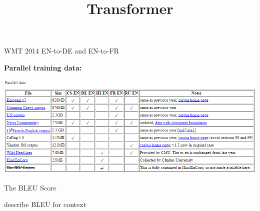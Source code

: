 



\newcommand{\titlefigure}{figure/transformer_sq.png}
\newcommand{\learninggoals}{
\item Understand the use of the Transformer}

\title{Transformer}
\date{}




\begin{vbframe}{WMT 2014 EN-to-DE and EN-to-FR}

\vfill

\textbf{Parallel training data:}

\includegraphics[width=.9\textwidth]{figure/wmt14}

\vfill

\end{vbframe}


\begin{vbframe}{The BLEU Score}

describe BLEU for context

\end{vbframe}


